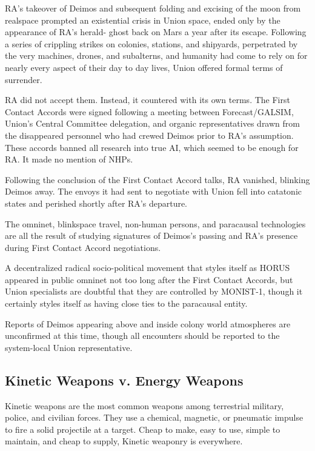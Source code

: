 RA’s takeover of Deimos and subsequent folding and excising of the moon from realspace
prompted an existential crisis in Union space, ended only by the appearance of RA’s herald-
ghost back on Mars a year after its escape. Following a series of crippling strikes on colonies,
stations, and shipyards, perpetrated by the very machines, drones, and subalterns, and humanity
had come to rely on for nearly every aspect of their day to day lives, Union offered formal terms
of surrender.

RA did not accept them. Instead, it countered with its own terms. The First Contact Accords
were signed following a meeting between Forecast/GALSIM, Union’s Central Committee
delegation, and organic representatives drawn from the disappeared personnel who had crewed
Deimos prior to RA’s assumption. These accords banned all research into true AI, which seemed
to be enough for RA. It made no mention of NHPs.

Following the conclusion of the First Contact Accord talks, RA vanished, blinking Deimos away.
The envoys it had sent to negotiate with Union fell into catatonic states and perished shortly after
RA’s departure.

The omninet, blinkspace travel, non-human persons, and paracausal technologies are all the
result of studying signatures of Deimos’s passing and RA’s presence during First Contact Accord
negotiations.

A decentralized radical socio-political movement that styles itself as HORUS appeared in public
omninet not too long after the First Contact Accords, but Union specialists are doubtful that they
are controlled by MONIST-1, though it certainly styles itself as having close ties to the paracausal
entity.

Reports of Deimos appearing above and inside colony world atmospheres are unconfirmed at
this time, though all encounters should be reported to the system-local Union representative.

\subsection{Kinetic Weapons v. Energy Weapons}

Kinetic weapons are the most common weapons among terrestrial military, police, and civilian
forces. They use a chemical, magnetic, or pneumatic impulse to fire a solid projectile at a target.
Cheap to make, easy to use, simple to maintain, and cheap to supply, Kinetic weaponry is
everywhere.

